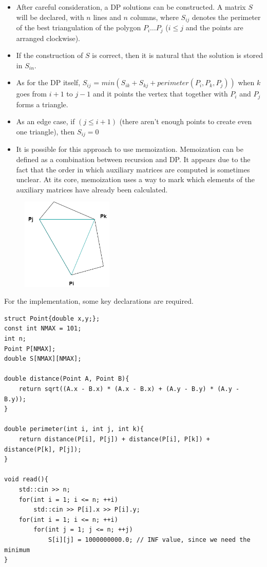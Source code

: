 \documentclass[letterpaper]{article}
\begin{document}
\begin{itemize}
    \item After careful consideration, a DP solutions can be constructed. A matrix $S$ will be declared, with $n$ lines and $n$ columns, where $S_{ij}$ denotes the perimeter of the best triangulation of the polygon $P_{i} \dots P_{j}$ ($i \leq j$ and the points are arranged clockwise). 

    \item If the construction of $S$ is correct, then it is natural that the solution is stored in $S_{in}$.

    \item As for the DP itself, $S_{ij}$ = $min(S_{ik} + S_{kj} + perimeter(P_{i}, P_{k}, P_{j}))$ when $k$ goes from $i + 1$ to $j - 1$ and it points the vertex that together with $P_{i}$ and $P_{j}$ forms a triangle.

    \item As an edge case, if $(j \leq i + 1)$ (there aren't enough points to create even one triangle), then $S_{ij} = 0$

    \item It is possible for this approach to use memoization. Memoization can be defined as a combination between recursion and DP. It appears due to the fact that the order in which auxiliary matrices are computed is sometimes unclear. At its core, memoization uses a way to mark which elements of the auxiliary matrices have already been calculated.
\end{itemize}

\begin{figure} [h!]
\centering
\includegraphics[width=0.39\textwidth]{pngOfDiagrams/geometrydp2.png}
\end{figure}

For the implementation, some key declarations are required.

\begin{lstlisting}
struct Point{double x,y;};
const int NMAX = 101;
int n;
Point P[NMAX];
double S[NMAX][NMAX];

double distance(Point A, Point B){
    return sqrt((A.x - B.x) * (A.x - B.x) + (A.y - B.y) * (A.y - B.y));
}

double perimeter(int i, int j, int k){
    return distance(P[i], P[j]) + distance(P[i], P[k]) + distance(P[k], P[j]);
}

void read(){
    std::cin >> n;
    for(int i = 1; i <= n; ++i)
        std::cin >> P[i].x >> P[i].y;
    for(int i = 1; i <= n; ++i)
        for(int j = 1; j <= n; ++j)
            S[i][j] = 1000000000.0; // INF value, since we need the minimum
}
\end{lstlisting}
\end{document}
